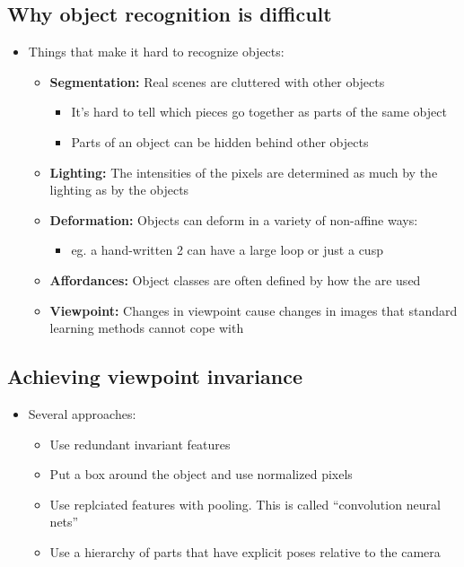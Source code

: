 \subsection{Why object recognition is difficult}
\begin{itemize}[--]
	\item Things that make it hard to recognize objects:
	\begin{itemize}[--]
		\item \textbf{Segmentation:} Real scenes are cluttered with other objects
			\begin{itemize}[--]
				\item It's hard to tell which pieces go together as parts of the same object
				\item Parts of an object can be hidden behind other objects
			\end{itemize}

		\item \textbf{Lighting:} The intensities of the pixels are determined as much by the lighting as by the objects
		\item \textbf{Deformation:} Objects can deform in a variety of non-affine ways:
			\begin{itemize}[--]
				\item eg. a hand-written 2 can have a large loop or just a cusp
			\end{itemize}

		\item \textbf{Affordances:} Object classes are often defined by how the are used
		\item \textbf{Viewpoint:} Changes in viewpoint cause changes in images that standard learning methods cannot cope with
	\end{itemize}
\end{itemize}

\subsection{Achieving viewpoint invariance}
\begin{itemize}[--]
	\item Several approaches:
	\begin{itemize}[--]
		\item Use redundant invariant features
		\item Put a box around the object and use normalized pixels
		\item Use replciated features with pooling. This is called ``convolution neural nets''
		\item Use a hierarchy of parts that have explicit poses relative to the camera
	\end{itemize}
\end{itemize}

